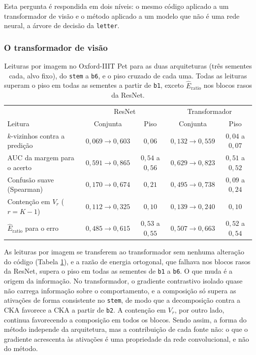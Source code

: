Esta pergunta é respondida em dois níveis: o mesmo código aplicado a um transformador de visão e o método aplicado a um modelo que não é uma rede neural, a árvore de decisão da \texttt{letter}.

\subsubsection*{O transformador de visão}

\begin{table}[htbp]
\centering
\caption{Leituras por imagem no Oxford-IIIT Pet para as duas arquiteturas (três sementes cada, alvo fixo), do \texttt{stem} a \texttt{b6}, e o piso cruzado de cada uma. Todas as leituras superam o piso em todas as sementes a partir de \texttt{b1}, exceto $\widehat{E}_{\mathrm{ratio}}$ nos blocos rasos da ResNet.}
\label{tab:res_arquitetura}
\small
\begin{tabular}{l c c c c}
\hline
 & \multicolumn{2}{c}{ResNet} & \multicolumn{2}{c}{Transformador} \\
Leitura & Conjunta & Piso & Conjunta & Piso \\
\hline
$k$-vizinhos contra a predição & $0{,}069 \to 0{,}603$ & $0{,}06$ & $0{,}132 \to 0{,}559$ & $0{,}04$ a $0{,}07$ \\
AUC da margem para o acerto & $0{,}591 \to 0{,}865$ & $0{,}54$ a $0{,}56$ & $0{,}629 \to 0{,}823$ & $0{,}51$ a $0{,}52$ \\
Confusão suave (Spearman) & $0{,}170 \to 0{,}674$ & $0{,}21$ & $0{,}495 \to 0{,}738$ & $0{,}09$ a $0{,}24$ \\
Contenção em $V_r$ ($r = K-1$) & $0{,}112 \to 0{,}325$ & $0{,}10$ & $0{,}139 \to 0{,}240$ & $0{,}10$ \\
$\widehat{E}_{\mathrm{ratio}}$ para o erro & $0{,}485 \to 0{,}615$ & $0{,}53$ a $0{,}55$ & $0{,}507 \to 0{,}663$ & $0{,}52$ a $0{,}54$ \\
\hline
\end{tabular}
\end{table}

As leituras por imagem se transferem ao transformador sem nenhuma alteração do código (Tabela \ref{tab:res_arquitetura}), e a razão de energia ortogonal, que falhava nos blocos rasos da ResNet, supera o piso em todas as sementes de \texttt{b1} a \texttt{b6}. O que muda é a origem da informação. No transformador, o gradiente contrastivo isolado quase não carrega informação sobre o comportamento, e a composição só supera as ativações de forma consistente no \texttt{stem}, de modo que a decomposição contra a CKA favorece a CKA a partir de \texttt{b2}. A contenção em $V_r$, por outro lado, continua favorecendo a composição em todos os blocos. Sendo assim, a forma do método independe da arquitetura, mas a contribuição de cada fonte não: o que o gradiente acrescenta às ativações é uma propriedade da rede convolucional, e não do método.

